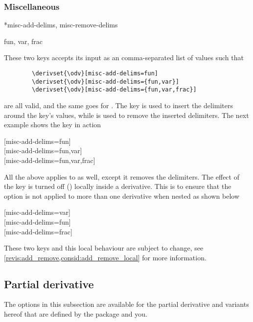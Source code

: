 \documentclass[final,british,10pt]{scrartcl}
\theoremstyle{remark}
\begin{document}
	\subsubsection*{Miscellaneous}
	
	\begin{option}*{misc-add-delims, misc-remove-delims}
		\begin{values}
			fun, var, frac
		\end{values}
		These two keys accepts its input as an comma-separated list of values such that
		\begin{verbatim}
		\derivset{\odv}[misc-add-delims=fun]
		\derivset{\odv}[misc-add-delims={fun,var}]
		\derivset{\odv}[misc-add-delims={fun,var,frac}]
		\end{verbatim}
		are all valid, and the same goes for  . The key  is used to insert the delimiters around the key's values, while  is used to remove the inserted delimiters. The next example shows the key  in action
		
		\begin{example}
			\derivset{\odv}[misc-add-delims=fun]             \\
			\derivset{\odv}[misc-add-delims={fun,var}]       \\
			\derivset{\odv}[misc-add-delims={fun,var,frac}] 
		\end{example}
		
		\noindent All the above applies to  as well, except it removes the delimiters. The effect of the key  is turned off () locally inside a derivative. This is to ensure that the option is not applied to more than one derivative when nested as shown below
		
		\begin{example}
			\derivset{\odv}[misc-add-delims=var]  \odv*{\odv{y}{x}}{x} \\
			\derivset{\odv}[misc-add-delims=fun]  \odv*{\odv{y}{x}}{x} \\
			\derivset{\odv}[misc-add-delims=frac] \odv*{\odv{y}{x}}{x}
		\end{example}
		
		\noindent These two keys and this local behaviour are subject to change, see \cref{revis:add_remove,consid:add_remove_local} for more information. 
	\end{option}
	
	
	\subsection{Partial derivative} \label{ssec:pdv_options}
	The options in this subsection are available for the partial derivative \macro{\pdv} and variants hereof that are defined by the package and you.
	
\end{document}
